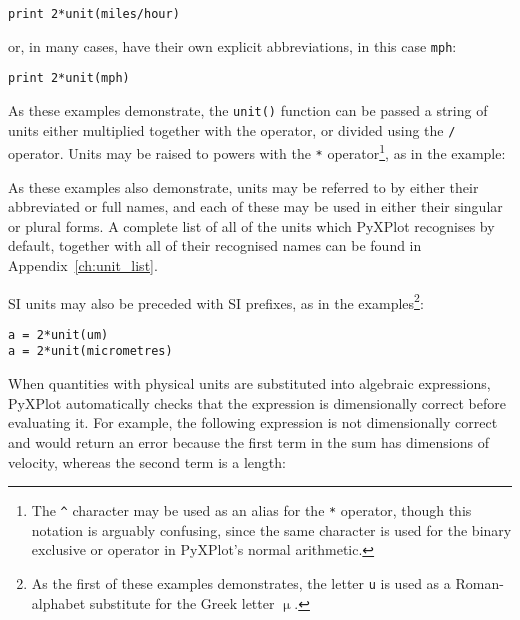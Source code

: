 \begin{verbatim}
print 2*unit(miles/hour)
\end{verbatim}

\noindent or, in many cases, have their own explicit abbreviations, in this
case {\tt mph}:

\begin{verbatim}
print 2*unit(mph)
\end{verbatim}

\noindent As these examples demonstrate, the {\tt unit()} function can be
passed a string of units either multiplied together with the {\tt *} operator,
or divided using the {\tt /} operator. Units may be raised to powers with the
{\tt **} operator\footnote{The {\tt \^{}} character may be used as an alias for
the {\tt **} operator, though this notation is arguably confusing, since the
same character is used for the binary exclusive or operator in PyXPlot's normal
arithmetic.}, as in the example:

\vspace{3mm}
\newline
{}\newline
{}
\vspace{3mm}

\noindent As these examples also demonstrate, units may be referred to by either
their abbreviated or full names, and each of these may be used in either their
singular or plural forms.  A complete list of all of the units which PyXPlot
recognises by default, together with all of their recognised names can be found
in Appendix~\ref{ch:unit_list}.

SI units may also be preceded with SI prefixes, as in
the examples\footnote{As the first of these examples demonstrates, the letter
{\tt u} is used as a Roman-alphabet substitute for the Greek letter $\upmu$.}:

\begin{verbatim}
a = 2*unit(um)
a = 2*unit(micrometres)
\end{verbatim}

When quantities with physical units are substituted into algebraic expressions,
PyXPlot automatically checks that the expression is dimensionally correct
before evaluating it. For example, the following expression is not
dimensionally correct and would return an error because the first term in the
sum has dimensions of velocity, whereas the second term is a length:

